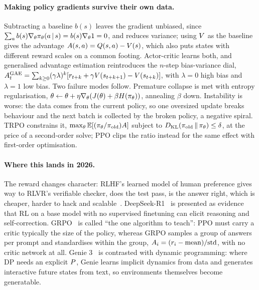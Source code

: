 \paragraph{Making policy gradients survive their own data.} Subtracting a baseline $b(s)$
leaves the gradient unbiased, since
$\sum_a b(s) \nabla_{\theta} \pi_{\theta}(a \,|\, s) = b(s)\nabla_{\theta} 1 = 0$, and reduces
variance; using $V$ as the baseline gives the advantage
$A(s,a) = Q(s,a) - V(s)$, which also puts states with different reward scales on a
common footing. Actor-critic learns both, and generalised advantage estimation reintroduces
the $n$-step bias-variance dial,
$A_t^{\text{GAE}} = \sum_{k \ge 0} (\gamma \lambda)^{k}
 [r_{t+k} + \gamma V(s_{t+k+1}) - V(s_{t+k})]$, with $\lambda = 0$ high bias and
$\lambda = 1$ low bias. Two failure modes follow. Premature collapse is met with entropy
regularisation, $\theta \leftarrow \theta + \eta \nabla_{\theta}(J(\theta)
+ \beta H(\pi_{\theta}))$, annealing $\beta$ down. Instability is worse: the data comes from the
current policy, so one oversized update breaks behaviour and the next batch is collected by
the broken policy, a negative spiral. TRPO constrains it,
$\max_{\theta} \operatorname*{\mathbb{E}}[(\pi_{\theta} / \pi_{\text{old}})A]$ subject to
$D_{\mathrm{KL}}\!\left(\pi_{\text{old}} \,\|\, \pi_{\theta}\right) \le \delta$, at the price of a second-order solve; PPO clips the
ratio instead for the same effect with first-order optimisation.

\paragraph{Where this lands in 2026.} The reward changes character: RLHF's learned model of
human preference gives way to RLVR's verifiable checker, does the test pass, is the answer
right, which is cheaper, harder to hack and scalable~\citep{lambert2024tulu3}.
DeepSeek-R1~\citep{deepseek2025r1} is presented as evidence that RL on a base model with no
supervised finetuning can elicit reasoning and self-correction. GRPO~\citep{shao2024grpo} is
called ``the one algorithm to teach'': PPO must carry a critic typically the size of the
policy, whereas GRPO samples a group of answers per prompt and standardises within the group,
$A_i = (r_i - \text{mean})/\text{std}$, with no critic network at all. Genie
3~\citep{bruce2024genie} is contrasted with dynamic programming: where DP needs an explicit
$P$, Genie learns implicit dynamics from data and generates interactive future states
from text, so environments themselves become generatable.

